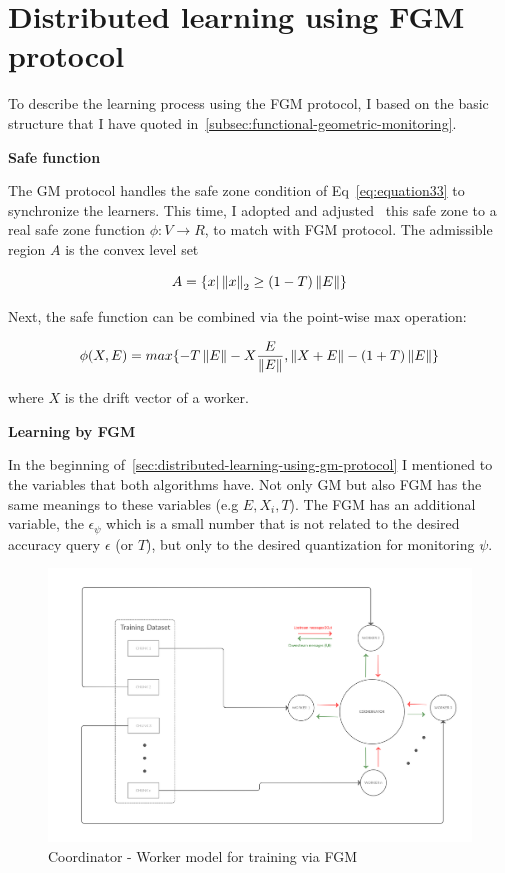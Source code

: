 \section{Distributed learning using FGM protocol}\label{sec:distributed-learning-using-fgm-protocol}

To describe the learning process using the FGM protocol, I based on the basic structure that I have quoted in~\ref{subsec:functional-geometric-monitoring}.

{\large \textbf{Safe function}}

The GM protocol handles the safe zone condition of Eq~\ref{eq:equation33} to synchronize the learners.
This time, I adopted and adjusted~\cite{samoladas_functional_nodate} this safe zone to a real safe zone function $\phi : V \rightarrow R$, to match with FGM protocol.
The admissible region $A$ is the convex level set

\begin{equation}
    A = \{ x | \left\lVert x\right\rVert_2 \geq (1 - T) \left\lVert E\right\rVert\}\label{eq:equation35}
\end{equation}


Next, the safe function can be combined via the point-wise max operation:

\begin{equation}
    \phi(X,E) = max\{-T\left\lVert E\right\rVert - X\frac{E}{\left\lVert E\right\rVert}, \left\lVert X+E\right\rVert - (1+T)\left\lVert E\right\rVert\}\label{eq:equation36}
\end{equation}

where $X$ is the drift vector of a worker.

{\large \textbf{Learning by FGM}}

In the beginning of~\ref{sec:distributed-learning-using-gm-protocol} I mentioned to the variables that both algorithms have.
Not only GM but also FGM has the same meanings to these variables (e.g $E, X_i, T$).
The FGM has an additional variable, the $\epsilon_\psi$ which is a small number that is not related to the desired accuracy query $\epsilon$ (or $T$),
but only to the desired quantization for monitoring $\psi$.

\vspace{2cm}

\begin{figure}[H]
    \centering
    \includegraphics[scale=.125]{./images/impl/arch-fgm.png}
    \caption{Coordinator - Worker model for training via FGM}
    \label{fig:arch-fgm}
\end{figure}


